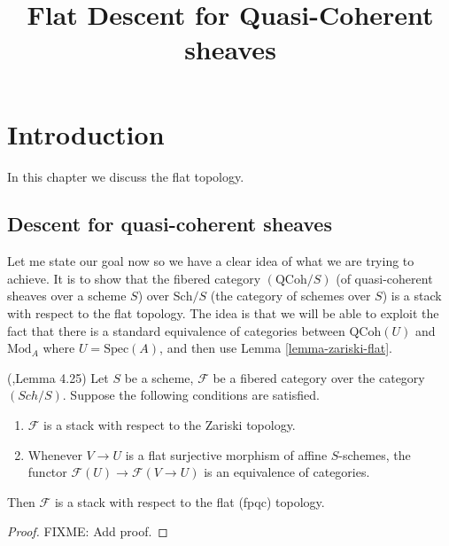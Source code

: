 

%


\title{Flat Descent for Quasi-Coherent sheaves}

\maketitle

\tableofcontents

\section{Introduction}
\label{section-introduction}

\noindent
In this chapter we discuss the flat topology.

\subsection{Descent for quasi-coherent sheaves}
\label{subsection-equivalence}

\noindent
Let me state our goal now so we have a clear idea of what we are
trying to achieve. It is to show that the fibered category $(\text{QCoh}/S)$
(of quasi-coherent sheaves over a scheme $S$) over $\text{Sch}/S$ (the
category of schemes over $S$) is a stack with respect to the flat
topology.  The idea is that we will be able to exploit the fact that
there is a standard equivalence of categories between $\text{QCoh}(U)$ and
$\text{Mod}_A$ where $U = \text{Spec}(A)$, and then use Lemma \ref{lemma-zariski-flat}.

\begin{lemma}\label{lemma-zariski-flat}
(\cite{Vis2},Lemma 4.25)
Let $S$ be a scheme, $\mathcal F$ be a fibered category over the
category $(Sch/S)$.  Suppose the following conditions are satisfied.
\begin{enumerate}
\item $\mathcal F$ is a stack with respect to the Zariski topology.
\item Whenever $V \rightarrow U$ is a flat surjective morphism of affine
$S$-schemes, the functor
$\mathcal F(U) \rightarrow  \mathcal F(V \rightarrow U)$ is an equivalence of
categories.
\end{enumerate}
Then $\mathcal F$ is a stack with respect to the flat (fpqc) topology.	
\end{lemma}
\begin{proof}
  FIXME: Add proof.
\end{proof}

